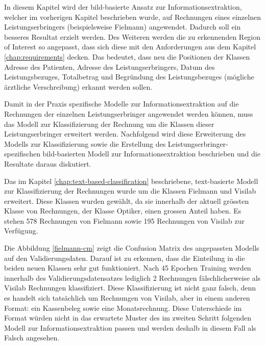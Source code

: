 In diesem Kapitel wird der bild-basierte Ansatz zur Informationsextraktion, welcher im vorherigen Kapitel beschrieben wurde, auf Rechnungen eines einzelnen Leistungserbringers (beispielsweise Fielmann) angewendet. Dadurch soll ein besseres Resultat erzielt werden. Des Weiteren werden die zu erkennenden Region of Interest so angepasst, dass sich diese mit den Anforderungen aus dem Kapitel \ref{chap:requirements} decken. Das bedeutet, dass neu die Positionen der Klassen Adresse des Patienten, Adresse des Leistungserbringers, Datum des Leistungsbezuges, Totalbetrag und Begründung des Leistungsbezuges (mögliche ärztliche Verschreibung) erkannt werden sollen.

Damit in der Praxis spezifische Modelle zur Informationsextraktion auf die Rechnungen der einzelnen Leistungserbringer angewendet werden können, muss das Modell zur Klassifizierung der Rechnung um die Klassen dieser Leistungserbringer erweitert werden. Nachfolgend wird diese Erweiterung des Modells zur Klassifizierung sowie die Erstellung des Leistungserbringer-spezifischen bild-basierten Modell zur Informationsextraktion beschrieben und die Resultate daraus diskutiert.

Das im Kapitel \ref{chap:text-based-classification} beschriebene, text-basierte Modell zur Klassifizierung der Rechnungen wurde um die Klassen Fielmann und Visilab erweitert. Diese Klassen wurden gewählt, da sie innerhalb der aktuell grössten Klasse von Rechnungen, der Klasse Optiker, einen grossen Anteil haben. Es stehen 578 Rechnungen von Fielmann sowie 195 Rechnungen von Visilab zur Verfügung.

Die Abbildung \ref{fielmann-cm} zeigt die Confusion Matrix des angepassten Modells auf den Validierungsdaten. Darauf ist zu erkennen, dass die Einteilung in die beiden neuen Klassen sehr gut funktioniert. Nach 45 Epochen Training werden innerhalb des Validierungsdatensatzes lediglich 2 Rechnungen fälschlicherweise als Visilab Rechnungen klassifiziert. Diese Klassifizierung ist nicht ganz falsch, denn es handelt sich tatsächlich um Rechnungen von Visilab, aber in einem anderen Format: ein Kassenbeleg sowie eine Monatsrechnung. Diese Unterschiede im Format würden nicht in das erwartete Muster des im zweiten Schritt folgenden Modell zur Informationsextraktion passen und werden deshalb in diesem Fall als Falsch angesehen.

